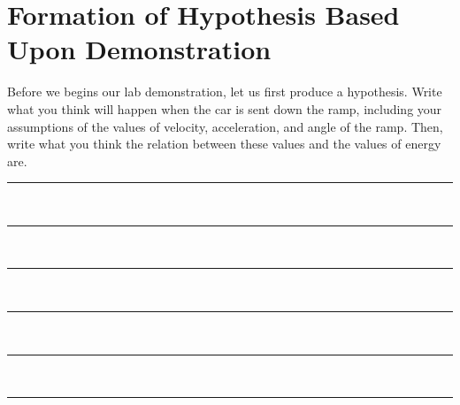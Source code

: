 \documentclass[12pt, letterpaper]{report}
\begin{document}
      \section{Formation of Hypothesis Based Upon Demonstration}
      \par Before we begins our lab demonstration, let us first produce a hypothesis. Write what you think will happen when the car is sent down the ramp, including your assumptions of the values of velocity, acceleration, and angle of the ramp. Then, write what you think the relation between these values and the values of energy are. \\

      \noindent \rule{6.5in}{0.15mm} \\

      \noindent \rule{6.5in}{0.15mm} \\

      \noindent \rule{6.5in}{0.15mm} \\

      \noindent \rule{6.5in}{0.15mm} \\

      \noindent \rule{6.5in}{0.15mm} \\

      \noindent \rule{6.5in}{0.15mm} \\

    \pagebreak
\end{document}
